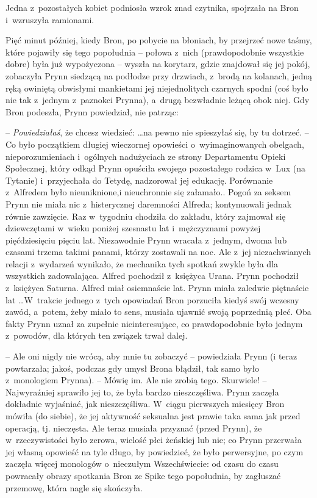 \documentclass[oneside,polish,11pt,rmheadings]{mwbk}
\begin{document}
Jedna z~pozostałych kobiet podniosła wzrok znad czytnika, spojrzała na Bron i~wzruszyła ramionami. 

Pięć minut później, kiedy Bron, po pobycie na błoniach, by przejrzeć nowe taśmy, które pojawiły się tego popołudnia -- połowa z~nich (prawdopodobnie wszystkie dobre) była już wypożyczona -- wyszła na korytarz, gdzie znajdował się jej pokój, zobaczyła Prynn siedzącą na podłodze przy drzwiach, z~brodą na kolanach, jedną ręką owiniętą obwisłymi mankietami jej niejednolitych czarnych spodni (coś było nie tak z~jednym z~paznokci Prynna), a~drugą bezwładnie leżącą obok niej. Gdy Bron podeszła, Prynn powiedział, nie patrząc:

-- \textit{Powiedziałaś}, że chcesz wiedzieć: \ldots  na pewno nie spieszyłaś się, by tu dotrzeć. -- Co było początkiem długiej wieczornej opowieści o~wyimaginowanych obelgach, nieporozumieniach i~ogólnych nadużyciach ze strony Departamentu Opieki Społecznej, który odkąd Prynn opuściła swojego pozostałego rodzica w~Lux (na Tytanie) i~przyjechała do Tetydę, nadzorował jej edukację. Porównanie z~Alfredem było nieuniknione,i nieuchronnie się załamało.. Pogoń za seksem Prynn nie miała nic z~histerycznej daremności Alfreda; kontynuowali jednak równie zawzięcie. Raz w~tygodniu chodziła do zakładu, który zajmował się dziewczętami w~wieku poniżej szesnastu lat i~mężczyznami powyżej pięćdziesięciu pięciu lat. Niezawodnie Prynn wracała z~jednym, dwoma lub czasami trzema takimi panami, którzy zostawali na noc. Ale z~jej niezachwianych relacji z~wydarzeń wynikało, że mechanika tych spotkań zwykle była dla wszystkich zadowalająca. Alfred pochodził z~księżyca Urana. Prynn pochodził z~księżyca Saturna. Alfred miał osiemnaście lat. Prynn miała zaledwie piętnaście lat \ldots   W~trakcie jednego z~tych opowiadań Bron porzuciła kiedyś swój wczesny zawód, a~potem, żeby miało to sens, musiała ujawnić swoją poprzednią płeć. Oba fakty Prynn uznał za zupełnie nieinteresujące, co prawdopodobnie było jednym z~powodów, dla których ten związek trwał dalej. 

-- Ale oni nigdy nie wrócą, aby mnie tu zobaczyć --  powiedziała Prynn (i teraz powtarzała; jakoś, podczas gdy umysł Brona błądził, tak samo było z~monologiem Prynna). -- Mówię im.  Ale nie zrobią tego. Skurwiele! -- Najwyraźniej sprawiło jej to, że była bardzo nieszczęśliwa. Prynn zaczęła dokładnie wyjaśniać, jak nieszczęśliwa. W~ciągu pierwszych miesięcy Bron mówiła (do siebie), że jej aktywność seksualna jest prawie taka sama jak przed operacją, tj. nieczęsta. Ale teraz musiała przyznać (przed Prynn), że w~rzeczywistości było zerowa, wielość płci żeńskiej lub nie; co Prynn przerwała jej własną opowieść na tyle długo, by powiedzieć, że było perwersyjne, po czym zaczęła więcej monologów o~nieczułym Wszechświecie: od czasu do czasu powracały obrazy spotkania Bron ze Spike tego popołudnia, by zagłuszać przemowę, która nagle się skończyła. 
\end{document}
